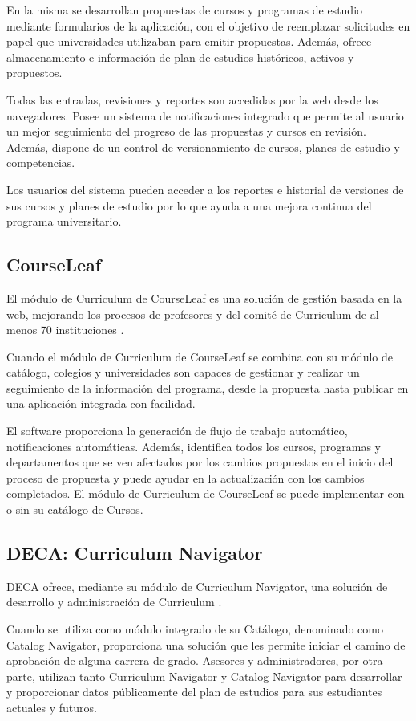 En la misma se desarrollan propuestas de cursos y programas de estudio mediante formularios de la aplicación, con el objetivo de reemplazar solicitudes en papel que universidades utilizaban para emitir propuestas. Además, ofrece almacenamiento e información de plan de estudios históricos, activos y propuestos.

Todas las entradas, revisiones y reportes son accedidas por la web desde los navegadores. Posee un sistema de notificaciones integrado que permite al usuario un mejor seguimiento del progreso de las propuestas y cursos en revisión. Además, dispone de un control de versionamiento de cursos, planes de estudio y competencias.

Los usuarios del sistema pueden acceder a los reportes e historial de versiones de sus cursos y planes de estudio por lo que ayuda a una mejora continua del programa universitario.

\subsection{CourseLeaf}
El módulo de Curriculum de CourseLeaf es una solución de gestión basada en la web, mejorando los procesos de profesores y del comité de Curriculum de al menos 70 instituciones \citep{courseleaf_webpage}.

Cuando el módulo de Curriculum de CourseLeaf se combina con su módulo de catálogo, colegios y universidades son capaces de gestionar y realizar un seguimiento de la información del programa, desde la propuesta hasta publicar en una aplicación integrada con facilidad.

El software proporciona la generación de flujo de trabajo automático, notificaciones automáticas. Además, identifica todos los cursos, programas y departamentos que se ven afectados por los cambios propuestos en el inicio del proceso de propuesta y puede ayudar en la actualización con los cambios completados. El módulo de Curriculum de CourseLeaf se puede implementar con o sin su catálogo de Cursos.

\subsection{DECA: Curriculum Navigator}
DECA ofrece, mediante su módulo de Curriculum Navigator, una solución de desarrollo y administración de Curriculum \citep{deca_webpage}.

Cuando se utiliza como módulo integrado de su Catálogo, denominado como Catalog Navigator, proporciona una solución que les permite iniciar el camino de aprobación de alguna carrera de grado. Asesores y administradores, por otra parte, utilizan tanto Curriculum Navigator y Catalog Navigator para desarrollar y proporcionar datos públicamente del plan de estudios para sus estudiantes actuales y futuros.

